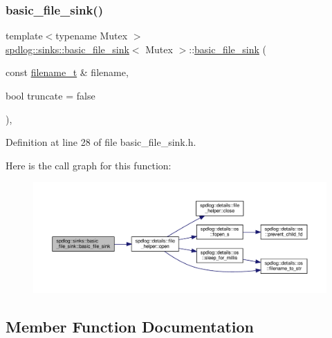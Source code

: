 \subsubsection{\texorpdfstring{basic\+\_\+file\+\_\+sink()}{basic\_file\_sink()}}
{\footnotesize\ttfamily template$<$typename Mutex $>$ \\
\hyperlink{classspdlog_1_1sinks_1_1basic__file__sink}{spdlog\+::sinks\+::basic\+\_\+file\+\_\+sink}$<$ Mutex $>$\+::\hyperlink{classspdlog_1_1sinks_1_1basic__file__sink}{basic\+\_\+file\+\_\+sink} (\begin{DoxyParamCaption}\item[{const \hyperlink{namespacespdlog_acf7ce125b3622e44f8f1702d699e0b06}{filename\+\_\+t} \&}]{filename,  }\item[{bool}]{truncate = {\ttfamily false} }\end{DoxyParamCaption})\hspace{0.3cm}{\ttfamily [inline]}, {\ttfamily [explicit]}}



Definition at line 28 of file basic\+\_\+file\+\_\+sink.\+h.

Here is the call graph for this function\+:
\nopagebreak
\begin{figure}[H]
\begin{center}
\leavevmode
\includegraphics[width=350pt]{classspdlog_1_1sinks_1_1basic__file__sink_a799e95cc46fd69b03f4ef7497aa21436_cgraph}
\end{center}
\end{figure}


\subsection{Member Function Documentation}
\mbox{\label{classspdlog_1_1sinks_1_1basic__file__sink_a689a12d9459d081edff7f8c7d3af227c}} 
